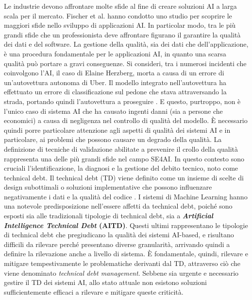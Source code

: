 Le industrie devono affrontare molte sfide al fine di creare soluzioni AI a larga scala per il mercato. Fischer et al. \cite{fischer2020ai} hanno condotto uno studio per scoprire le maggiori sfide nello sviluppo di applicazioni AI.
In particolar modo, tra le più grandi sfide che un professionista deve affrontare figurano il garantire la qualità dei dati e del software.
La gestione della qualità, sia dei dati che dell'applicazione, è una procedura fondamentale per le applicazioni AI, in quanto una scarsa qualità può portare a gravi conseguenze.
Si consideri, tra i numerosi incidenti che coinvolgono l'AI, il caso di Elaine Herzberg, morta a causa di un errore di un'autovettura autonoma di Uber.
Il modello integrato nell'autovettura ha effettuato un errore di classificazione sul pedone che stava attraversando la strada, portando quindi l'autovettura a proseguire \cite{AiIncident}.
E questo, purtroppo, non è l’unico caso di sistema AI che ha causato ingenti danni (sia a persone che economici) a causa di negligenza nel controllo di qualità del modello.
È necessario quindi porre particolare attenzione agli aspetti di qualità dei sistemi AI e in particolare, ai problemi che possono causare un degrado della qualità.
La definizione di tecniche di validazione abilitate a prevenire il crollo della qualità rappresenta una delle più grandi sfide nel campo SE4AI. In questo contesto sono cruciali l'identificazione, la diagnosi e la gestione del debito tecnico, noto come technical debt. Il technical debt (TD) viene definito come un insieme di scelte di design subottimali o soluzioni implementative che possono influenzare negativamente i dati e la qualità del codice \cite{Cunningham1992td}.
I sistemi di Machine Learning hanno una notevole predisposizione nell'essere affetti da technical debt, poiché sono esposti sia alle tradizionali tipologie di technical debt, sia a \textbf{\textit{Artificial Intelligence Technical Debt} (AITD)}.
Questi ultimi rappresentano le tipologie di technical debt che pregiudicano la qualità dei sistemi AI-based, e risultano difficili da rilevare perché presentano diverse granularità, arrivando quindi a definire la rilevazione anche a livello di sistema. È fondamentale, quindi, rilevare e mitigare tempestivamente le problematiche derivanti dal TD, attraverso ciò che viene denominato \textit{technical debt management}. Sebbene sia urgente e necessario gestire il TD dei sistemi AI, allo stato attuale non esistono soluzioni sufficientemente efficaci a rilevare e mitigare queste criticità.

